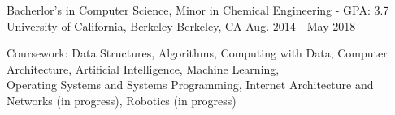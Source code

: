 

\begin{cventries}

  \cventry
    {Bacherlor's in Computer Science, Minor in Chemical Engineering - GPA: 3.7} %
    {University of California, Berkeley} %
    {Berkeley, CA} %
    {Aug. 2014 - May 2018} %
    {
      \begin{cvitems} %
        \item {Coursework: Data Structures, Algorithms, Computing with Data, Computer Architecture, Artificial Intelligence, Machine Learning,\\
        Operating Systems and Systems Programming, Internet Architecture and Networks (in progress), Robotics (in progress)}
      \end{cvitems}
    }

\end{cventries}
